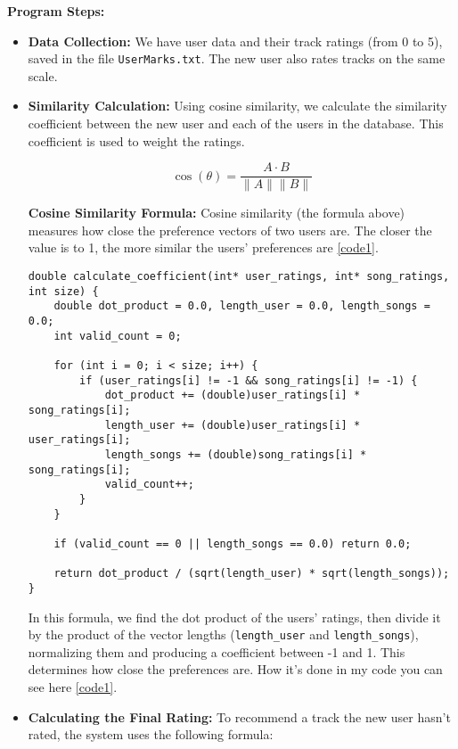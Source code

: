 \documentclass[12pt,a4paper]{article}
\begin{document}
\textbf{Program Steps:}
\begin{itemize}
    \item \textbf{Data Collection:} We have user data and their track ratings (from 0 to 5), saved in the file \texttt{UserMarks.txt}. The new user also rates tracks on the same scale.
    
    \item \textbf{Similarity Calculation:} Using cosine similarity, we calculate the similarity coefficient between the new user and each of the users in the database. This coefficient is used to weight the ratings.

    \[
    \cos(\theta) = \frac{A \cdot B}{\|A\| \|B\|}
    \]

    \textbf{Cosine Similarity Formula:} Cosine similarity (the formula above) measures how close the preference vectors of two users are. The closer the value is to 1, the more similar the users’ preferences are \autoref{code1}.


\begin{lstlisting}[label={code1}, caption={caption 1}]
double calculate_coefficient(int* user_ratings, int* song_ratings, int size) {
    double dot_product = 0.0, length_user = 0.0, length_songs = 0.0;
    int valid_count = 0;

    for (int i = 0; i < size; i++) {
        if (user_ratings[i] != -1 && song_ratings[i] != -1) {
            dot_product += (double)user_ratings[i] * song_ratings[i];
            length_user += (double)user_ratings[i] * user_ratings[i];
            length_songs += (double)song_ratings[i] * song_ratings[i];
            valid_count++;
        }
    }

    if (valid_count == 0 || length_songs == 0.0) return 0.0;

    return dot_product / (sqrt(length_user) * sqrt(length_songs));
}
\end{lstlisting}



    In this formula, we find the dot product of the users' ratings, then divide it by the product of the vector lengths (\texttt{length\_user} and \texttt{length\_songs}), normalizing them and producing a coefficient between -1 and 1. This determines how close the preferences are. How it's done in my code you can see here \autoref{code1}.

    \item \textbf{Calculating the Final Rating:} To recommend a track the new user hasn’t rated, the system uses the following formula:


\end{itemize}
\end{document}
